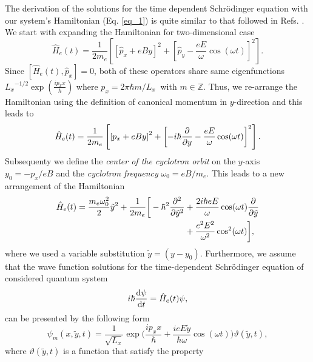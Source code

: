 The derivation of the solutions for the time dependent Schrödinger equation with our system's Hamiltonian (Eq. \ref{eq_1}) is quite similar to that followed in Refs. \cite{husimi53,dini16}. We start with expanding the Hamiltonian for two-dimensional case
\begin{equation} \label{eq_a1}
  \hat{H}_e(t) = \frac{1}{2m_e}\left[
    \left[\hat{p}_x + eBy \right]^2 +
    \left[\hat{p}_y - \frac{eE}{\omega}\cos(\omega t)\right]^2
  \right].
\end{equation}
Since $\left[\hat{H}_e(t),\hat{p}_x \right] =0$, both of these operators share same eigenfunctions
${L_x}^{-1/2}\exp(\frac{ip_x x}{\hbar})$ where $p_x = 2\pi \hbar m/L_x~$ with $ m \in \mathbb{Z}$.
Thus, we re-arrange the Hamiltonian using the definition of canonical momentum in $y$-direction and this leads to
\begin{equation} \label{eq_a2}
    \hat{H}_e(t) = \frac{1}{2m_e}\left[
      \left[{p}_x + eBy \right]^2 +
      \left[-i\hbar \pdv{y}- \frac{eE}{\omega}\cos(\omega t)\right]^2
    \right].
\end{equation}
Subsequenty we define the \textit{center of the cyclotron orbit} on the $y$-axis $y_0 = {-p_x}/{eB}$ and the \textit{cyclotron frequency} $\omega_0 = {eB}/{m_e}$. This leads to a new arrangement of the Hamiltonian
\begin{equation} \label{eq_a3}
  \begin{aligned}
    \hat{H}_e(t) =
      \frac{m_e \omega_0^2}{2}\tilde{y}^2 +
      \frac{1}{2m_e}\bigg[
      -\hbar^2 \pdv[2]{\tilde{y}} & +
      \frac{2i\hbar eE}{\omega}\cos(\omega t) \pdv{\tilde{y}} \\
      & +
      \frac{e^2E^2}{\omega^2}\cos[2](\omega t)
      \bigg],
  \end{aligned}
\end{equation}
where we used a variable substitution $\tilde{y} = (y - y_0)$. Furthermore, we assume that the wave function solutions for the time-dependent Schrödinger equation of considered quantum system
\begin{equation} \label{eq_a4}
    i \hbar \dv{\psi}{t} = \hat{H}_e(t)\psi,
\end{equation}
can be presented by the following form
\begin{equation} \label{eq_a5}
    \psi_m(x,\tilde{y},t) = \frac{1}{\sqrt{L_x}} \exp\bigg(
      \frac{ip_x x}{\hbar} +
      \frac{ieE\tilde{y}}{\hbar \omega}\cos(\omega t)
    \bigg) \vartheta(\tilde{y},t),
\end{equation}
where $\vartheta(\tilde{y},t)$ is a function that satisfy the property
